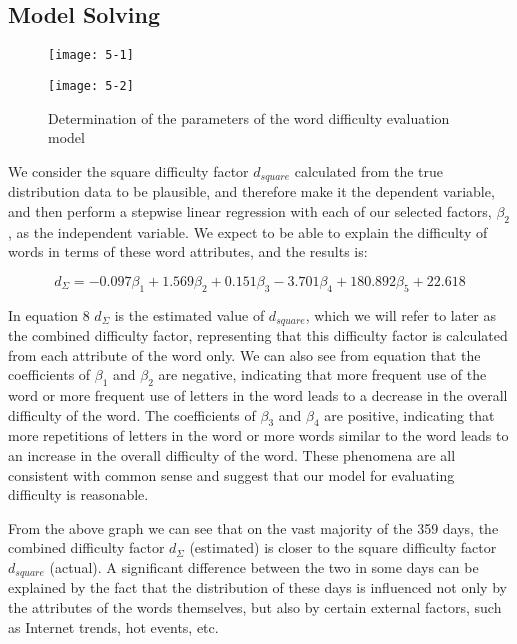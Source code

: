 \documentclass[12pt]{mcmthesis}
\begin{document}
\subsection{Model Solving}
\begin{figure}[h]
	\centering
	\begin{minipage}[c]{0.34\textwidth}
		\centering
		\texttt{[image: 5-1]}
		\label{fig10_1}
	\end{minipage}
	\begin{minipage}[c]{0.65\textwidth}
		\centering
		\texttt{[image: 5-2]}
		\label{fig10_2}
	\end{minipage}
	\caption{Determination of the parameters of the word difficulty evaluation model}
	\label{fig:10}
\end{figure}
We consider the square difficulty factor $ d_{square} $ calculated from the true distribution data to be plausible, and therefore make it the dependent variable, and then perform a stepwise linear regression with each of our selected factors, $ \beta_{2} $, as the independent variable. We expect to be able to explain the difficulty of words in terms of these word attributes, and the results is:

\begin{equation}\label{eq:14}
d_{\varSigma}=-0.097\beta _1+1.569\beta _2+0.151\beta _3-3.701\beta _4+180.892\beta _5+22.618
\end{equation}

In equation 8 $ d_{\varSigma} $ is the estimated value of $ d_{square} $, which we will refer to later as the combined difficulty factor, representing that this difficulty factor is calculated from each attribute of the word only. We can also see from equation that the coefficients of $ \beta_{1} $ and $ \beta_{2} $ are negative, indicating that more frequent use of the word or more frequent use of letters in the word leads to a decrease in the overall difficulty of the word. The coefficients of $ \beta_{3} $ and $ \beta_{4} $ are positive, indicating that more repetitions of letters in the word or more words similar to the word leads to an increase in the overall difficulty of the word. These phenomena are all consistent with common sense and suggest that our model for evaluating difficulty is reasonable.

From the above graph we can see that on the vast majority of the 359 days, the combined difficulty factor $ d_{\varSigma} $ (estimated) is closer to the square difficulty factor $ d_{square} $ (actual). A significant difference between the two in some days can be explained by the fact that the distribution of these days is influenced not only by the attributes of the words themselves, but also by certain external factors, such as Internet trends, hot events, etc.
\\[0.01pt]
\end{document}

